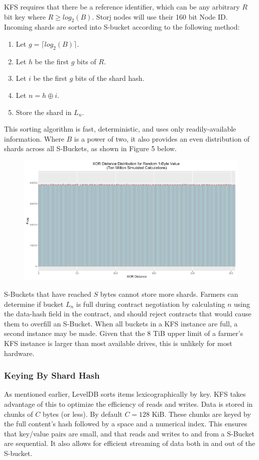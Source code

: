 \documentclass[a4paper,10pt]{article}
\begin{document}
KFS requires that there be a reference identifier, which can be any arbitrary $ R $ bit key where $ R \geq log_{2}(B) $. Storj nodes will use their 160 bit Node ID. Incoming shards are sorted into S-bucket according to the following method:

\begin{enumerate}
\item Let $ g = \lceil log_{2}(B) \rceil $.
\item Let $ h $ be the first $ g $ bits of $ R $.
\item Let $ i $ be the first $ g $ bits of the shard hash.
\item Let $ n = h \oplus i $.
\item Store the shard in $ L_{n} $.
\end{enumerate}

This sorting algorithm is fast, deterministic, and uses only readily-available information. Where $ B $ is a power of two, it also provides an even distribution of shards across all S-Buckets, as shown in Figure 5 below.


\begin{figure}[hbt]
\centering
\includegraphics[width=\linewidth]{5}
\end{figure}

S-Buckets that have reached $ S $ bytes cannot store more shards. Farmers can determine if bucket $ L_{n} $ is full during contract negotiation by calculating $ n $ using the data-hash field in the contract, and should reject contracts that would cause them to overfill an S-Bucket. When all buckets in a KFS instance are full, a second instance may be made. Given that the 8 TiB upper limit of a farmer’s KFS instance is larger than most available drives, this is unlikely for most hardware.

\subsubsection{Keying By Shard Hash}
As mentioned earlier, LevelDB sorts items lexicographically by key. KFS takes advantage of this to optimize the efficiency of reads and writes. Data is stored in chunks of $ C $ bytes (or less). By default $ C = 128 $ KiB. These chunks are keyed by the full content's hash followed by a space and a numerical index. This ensures that key/value pairs are small, and that reads and writes to and from a S-Bucket are sequential. It also allows for efficient streaming of data both in and out of the S-bucket.
\end{document}
